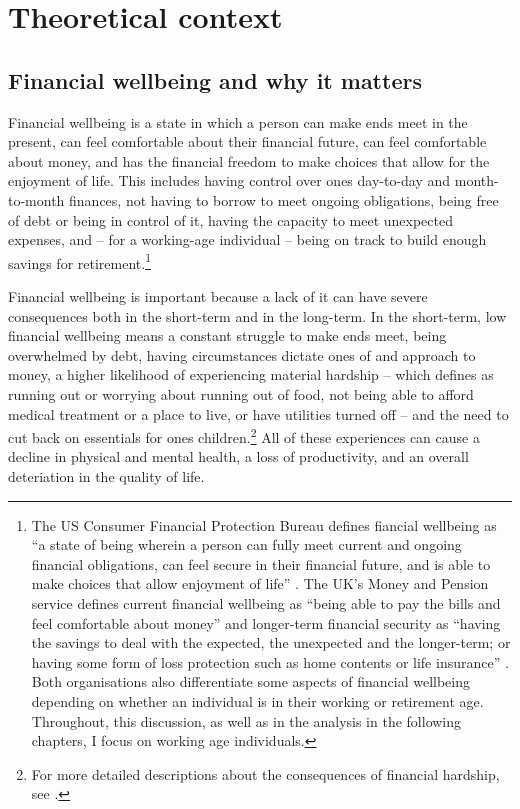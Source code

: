 
\section{Theoretical context}%
\label{sec:theoretical_context}


\subsection{Financial wellbeing and why it matters}%
\label{sub:financial_wellbeing_and_why_it_matters}

Financial wellbeing is a state in which a person can make ends meet in the
present, can feel comfortable about their financial future, can feel
comfortable about money, and has the financial freedom to make choices that
allow for the enjoyment of life. This includes having control over ones
day-to-day and month-to-month finances, not having to borrow to meet
ongoing obligations, being free of debt or being in control of it, having the
capacity to meet unexpected expenses, and -- for a working-age individual --
being on track to build enough savings for retirement.\footnote{The US Consumer
    Financial Protection Bureau defines fiancial wellbeing as ``a state of
    being wherein a person can fully meet current and ongoing financial
    obligations, can feel secure in their financial future, and is able to make
    choices that allow enjoyment of life'' \citep{cfpb2015financial}. The UK's
    Money and Pension service defines current financial wellbeing as ``being
    able to pay the bills and feel comfortable about money'' and longer-term
    financial security as ``having the savings to deal with the expected, the
    unexpected and the longer-term; or having some form of loss protection such
    as home contents or life insurance'' \citep{mps2018building}. Both
    organisations also differentiate some aspects of financial wellbeing
    depending on whether an individual is in their working or retirement age.
Throughout, this discussion, as well as in the analysis in the following
chapters, I focus on working age individuals.}

Financial wellbeing is important because a lack of it can have severe
consequences both in the short-term and in the long-term. In the short-term,
low financial wellbeing means a constant struggle to make ends meet, being
overwhelmed by debt, having circumstances dictate ones of and approach to
money, a higher likelihood of experiencing material hardship -- which
\citep{cfpb2017financial} defines as running out or worrying about running out
of food, not being able to afford medical treatment or a place to live, or have
utilities turned off -- and the need to cut back on essentials for ones
children.\footnote{For more detailed descriptions about the consequences of
    financial hardship, see \citet{cfpb2017financial, mps2018building,
stepchange2017strengthening}.} All of these experiences can cause a decline in
physical and mental health, a loss of productivity, and an overall deteriation
in the quality of life.

